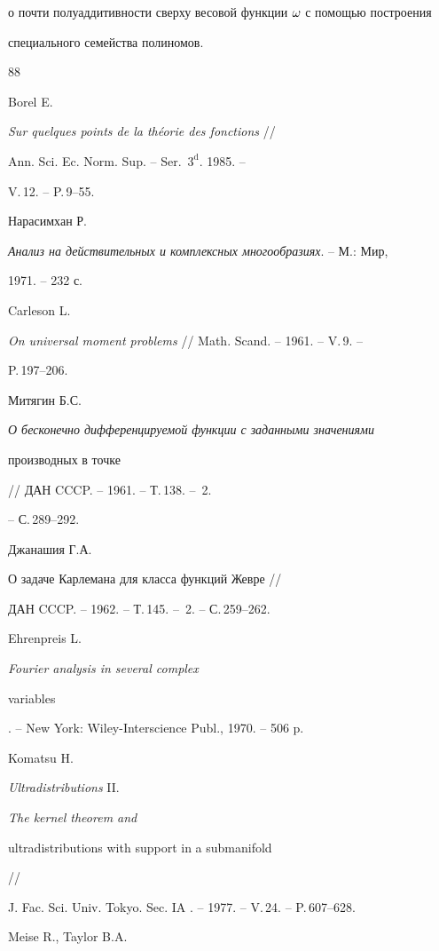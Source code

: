 о почти полуаддитивности сверху весовой функции $\omega$ с помощью построения 


специального семейства полиномов.








\begin{thebibliography}{88}





 Borel E. 


{\em Sur quelques points de la th\'{e}orie des fonctions} //


Ann. Sci. Ec.  Norm. Sup. -- Ser.~$3^{\mathrm d}$. 1985. --


V.\,12. -- P.\,9--55.


 Нарасимхан Р.


{\em Анализ на действительных и комплексных многообразиях}. -- М.: Мир, 


1971. -- 232 с.


 Carleson L. 


{\em On universal moment problems} // Math. Scand. -- 1961. -- V.\,9. -- 


P.\,197--206.


 Митягин Б.С. 


{\em О бесконечно дифференцируемой функции с заданными значениями 


производных в точке} // ДАН CCCP. -- 1961. -- Т.\,138. -- \No\,2.


-- С.\,289--292.


 Джанашия Г.А. 


{О задаче Карлемана для класса функций Жевре} //


ДАН CCCP. -- 1962. -- Т.\,145. -- \No\,2. -- С.\,259--262.


 Ehrenpreis L.


{\em Fourier analysis in several complex


variables}. -- New York: Wiley-Interscience Publ., 1970. -- 506 p.


 Komatsu H.


{\em Ultradistributions} II. {\em The kernel theorem and 


ultradistributions with support in a submanifold} //


J. Fac. Sci. Univ. Tokyo. Sec. IA . -- 1977. -- V.\,24. -- P.\,607--628.


 Meise R., Taylor B.A. 



\end{thebibliography}
